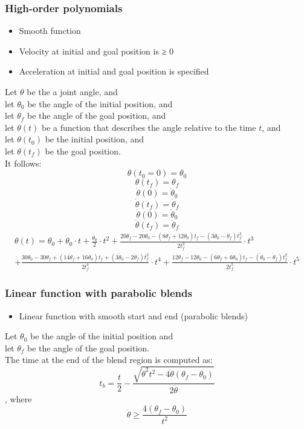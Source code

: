 \documentclass[10pt,a4paper]{article}
\begin{document}
\subsubsection{High-order polynomials}
\begin{itemize}
	\item Smooth function
	\item Velocity at initial and goal position is ≥ 0
	\item Acceleration at initial and goal position is specified
\end{itemize}
Let $\theta$ be the a joint angle, and \\
let $\theta_0$ be the angle of the initial position, and \\
let $\theta_f$ be the angle of the goal position, and \\
let $\theta(t)$ be a function that describes the angle relative to the time $t$, and \\
let $\theta(t_0)$ be the initial position, and \\
let $\theta(t_f)$ be the goal position. \\
It follows: \\
$$
\theta(t_0 = 0) = \theta_0
$$
$$
\theta(t_f) = \theta_f
$$
$$
\dot{\theta}(0) = \dot{\theta}_0
$$
$$
\dot{\theta}(t_f) = \dot{\theta}_f
$$
$$
\ddot{\theta}(0) = \ddot{\theta}_0
$$
$$
\ddot{\theta}(t_f) = \ddot{\theta}_f
$$
$$
\begin{multlined}
\theta(t) = \theta_0 + \dot{\theta}_0 ⋅ t + \frac{\ddot{\theta}_0}{2} ⋅ t^2 + \frac{20\theta_f - 20\theta_0 - (8\dot{\theta}_f + 12\dot{\theta}_0)t_f - (3\ddot{\theta}_0 - \ddot{\theta}_f)t_f^2}{2 t_f^3} ⋅ t^3 \\ + \frac{30\theta_0 - 30\theta_f + (14\dot{\theta}_f + 16\dot{\theta}_0)t_f + (3\ddot{\theta}_0 - 2\ddot{\theta}_f)t_f^2}{2 t_f^4} ⋅ t^4 + \frac{12\theta_f - 12\theta_0 - (6\dot{\theta}_f + 6\dot{\theta}_0)t_f - (\ddot{\theta}_0 - \ddot{\theta}_f)t_f^2}{2 t_f^5} ⋅ t^5
\end{multlined}
$$

\subsubsection{Linear function with parabolic blends}
\begin{itemize}
	\item Linear function with smooth start and end (parabolic blends)
\end{itemize}
Let $\theta_0$ be the angle of the initial position and \\
let $\theta_f$ be the angle of the goal position. \\
The time at the end of the blend region is computed as:
$$
	t_b = \frac t 2 - \frac{\sqrt{\ddot{\theta}^2t^2 - 4\ddot{\theta}(\theta_f - \theta_0)}}{2\ddot{\theta}}
$$
, where
$$
	\ddot{\theta} ≥ \frac{4(\theta_f - \theta_0)}{t^2}
$$
\\
\end{document}

